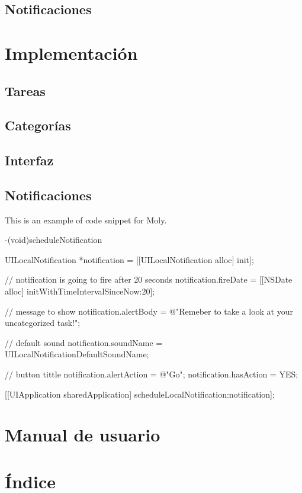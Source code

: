 \documentclass[parskip=half*]{scrartcl}
\begin{document}
\subsection{Notificaciones}


\section{Implementación}

\subsection{Tareas}

\subsection{Categorías}

\subsection{Interfaz}

\subsection{Notificaciones}

This is an example of code snippet for Moly.
\begin{verbatimtab}
-(void)scheduleNotification
{
    UILocalNotification *notification = [[UILocalNotification alloc] init];
    
    // notification is going to fire after 20 seconds
    notification.fireDate = [[NSDate alloc] initWithTimeIntervalSinceNow:20];
    
    // message to show
    notification.alertBody = @"Remeber to take a look at your uncategorized task!";
    
    // default sound
    notification.soundName = UILocalNotificationDefaultSoundName;
    
    // button tittle
    notification.alertAction = @"Go";
    notification.hasAction = YES;
    
    [[UIApplication sharedApplication] scheduleLocalNotification:notification];
}
\end{verbatimtab}


\section{Manual de usuario}


\section{Índice}

\printindex
\end{document}
